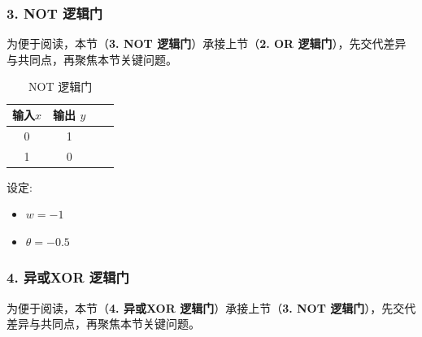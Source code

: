 \subsubsection*{\bf 3.  NOT 逻辑门}


为便于阅读，本节（{\bf 3.  NOT 逻辑门}）承接上节（{\bf 2.  OR 逻辑门}），先交代差异与共同点，再聚焦本节关键问题。

\begin{table}[htbp]
\centering
\caption{NOT 逻辑门}
\begin{tabular}{|c|c|c|c|}
\hline
{\bf 输入$x$}  & 输出 $y$ \\
\hline
0  & 1   \\
\hline
1  & 0    \\
\hline
\end{tabular}
\label{NOT 逻辑门}
\end{table}
设定:
\begin{itemize}
\item $w =-1 $
\item $\theta =-0.5$
\end{itemize}
\subsubsection*{\bf 4.  异或XOR 逻辑门}


为便于阅读，本节（{\bf 4.  异或XOR 逻辑门}）承接上节（{\bf 3.  NOT 逻辑门}），先交代差异与共同点，再聚焦本节关键问题。

